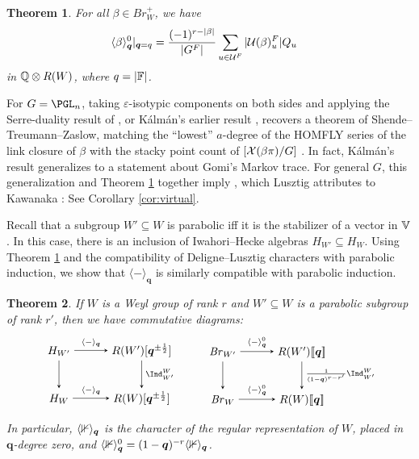 \documentclass[a4paper,10pt,leqno]{amsart}
\theoremstyle{plain}
\newtheorem{mainthm}{Theorem}
\theoremstyle{plain}
\theoremstyle{plain}
\theoremstyle{definition}
\theoremstyle{remark}
\newcommand{\Br}{\mathit{Br}}
\newcommand{\Q}{\bm{q}}
\newcommand{\Tr}[1]{\langle{#1}\rangle_{\Q}}
\begin{document}
\begin{mainthm}\label{thm:virtual}
For all $\beta \in \Br_W^+$, we have
\begin{align}
\Tr{\beta}^0|_{\Q = q}
&= \frac{(-1)^{r - |\beta|}}{|G^F|}
	\sum_{u \in \cal{U}^F}
	|\cal{U}(\beta)_u^F| Q_u
\end{align}
in $\bb{Q} \otimes R(W)$, where $q = |\bb{F}|$.
\end{mainthm}

For $G = \PGL_n$, taking $\varepsilon$-isotypic components on both sides and applying the Serre-duality result of \cite{ghmn}, or K\'alm\'an's earlier result \cite{kalman}, recovers a theorem of Shende--Treumann--Zaslow, matching the ``lowest'' $a$-degree of the HOMFLY series of the link closure of $\beta$ with the stacky point count of $[\cal{X}(\beta\pi)/G]$ \cite[Thm.\ 6.34]{stz}.
In fact, K\'alm\'an's result generalizes to a statement about Gomi's Markov trace.
For general $G$, this generalization and Theorem \ref{thm:virtual} together imply \cite[Prop.\ 2.2]{lusztig_2021}, which Lusztig attributes to Kawanaka \cite{kawanaka}: See Corollary \ref{cor:virtual}.

Recall that a subgroup $W' \subseteq W$ is parabolic iff it is the stabilizer of a vector in $\bb{V}$.
In this case, there is an inclusion of Iwahori--Hecke algebras $H_{W'} \subseteq H_W$.
Using Theorem \ref{thm:virtual} and the compatibility of Deligne--Lusztig characters with parabolic induction, we show that $\Tr{-}$ is similarly compatible with parabolic induction.

\begin{mainthm}\label{thm:induction}
If $W$ is a Weyl group of rank $r$ and $W' \subseteq W$ is a parabolic subgroup of rank $r'$, then we have commutative diagrams:
\begin{equation}
\begin{tikzpicture}[baseline=(current bounding box.center), >=stealth]
\matrix(m)[matrix of math nodes, row sep=2.5em, column sep=3em, text height=2ex, text depth=0.5ex]
{	H_{W'}
		&R(W')[\Q^{\pm \frac{1}{2}}]\\
	H_W
		&R(W)[\Q^{\pm \frac{1}{2}}]\\
		};
\path[->,font=\scriptsize, auto]
(m-1-1)		edge node{$\Tr{-}$} (m-1-2)
			edge (m-2-1)
(m-1-2) 	edge node{$\Ind_{W'}^W$} (m-2-2)
(m-2-1) 	edge node{$\Tr{-}$} (m-2-2);
\end{tikzpicture}
\qquad
\begin{tikzpicture}[baseline=(current bounding box.center), >=stealth]
\matrix(m)[matrix of math nodes, row sep=2.5em, column sep=3em, text height=2ex, text depth=0.5ex]
{	\Br_{W'}
		&R(W')[\![\Q]\!]\\
	\Br_W
		&R(W)[\![\Q]\!]\\
		};
\path[->,font=\scriptsize, auto]
(m-1-1)		edge node{$\Tr{-}^0$} (m-1-2)
			edge (m-2-1)
(m-1-2) 	edge node{$\frac{1}{(1 - \Q)^{r - r'}} \Ind_{W'}^W$} (m-2-2)
(m-2-1) 	edge node{$\Tr{-}^0$} (m-2-2);
\end{tikzpicture}
\end{equation}
In particular, $\Tr{\bb{1}}$ is the character of the regular representation of $W$, placed in $\Q$-degree zero, and $\Tr{\bb{1}}^0 = (1 - \Q)^{-r}\Tr{\bb{1}}$.
\end{mainthm}
\end{document}
